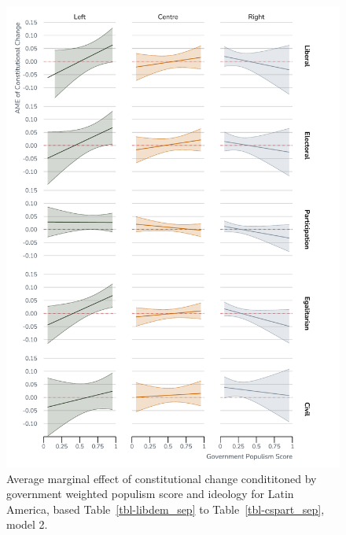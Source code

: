 \documentclass[
  abstract]{article}
\begin{document}
\begin{figure}[H]

{\centering \includegraphics{results/graphs/constchange_la.pdf}

}

\caption{\label{fig-la}Average marginal effect of constitutional change
condititoned by government weighted populism score and ideology for
Latin America, based Table~\ref{tbl-libdem_sep} to
Table~\ref{tbl-cspart_sep}, model 2.}

\end{figure}

\blandscape
\renewcommand{\arraystretch}{0.5}
\end{document}
